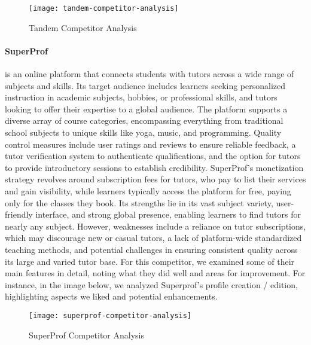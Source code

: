 \begin{figure}[h]
    \centering
    \texttt{[image: tandem-competitor-analysis]}
    \caption{Tandem Competitor Analysis}
    \label{fig:figure8}
\end{figure}

\paragraph{SuperProf} is an online platform that connects students with tutors across a wide range of subjects and skills.
Its target audience includes learners seeking personalized instruction in academic subjects, hobbies, or professional skills, and tutors looking to offer their expertise to a global audience.
The platform supports a diverse array of course categories, encompassing everything from traditional school subjects to unique skills like yoga, music, and programming.
Quality control measures include user ratings and reviews to ensure reliable feedback, a tutor verification system to authenticate qualifications, and the option for tutors to provide introductory sessions to establish credibility.
SuperProf's monetization strategy revolves around subscription fees for tutors, who pay to list their services and gain visibility, while learners typically access the platform for free, paying only for the classes they book.
Its strengths lie in its vast subject variety, user-friendly interface, and strong global presence, enabling learners to find tutors for nearly any subject.
However, weaknesses include a reliance on tutor subscriptions, which may discourage new or casual tutors, a lack of platform-wide standardized teaching methods, and potential challenges in ensuring consistent quality across its large and varied tutor base.
For this competitor, we examined some of their main features in detail, noting what they did well and areas for improvement.
For instance, in the image below, we analyzed Superprof's profile creation / edition, highlighting aspects we liked and potential enhancements.

\begin{figure}[h]
    \centering
    \texttt{[image: superprof-competitor-analysis]}
    \caption{SuperProf Competitor Analysis}
    \label{fig:figure9}
\end{figure}

